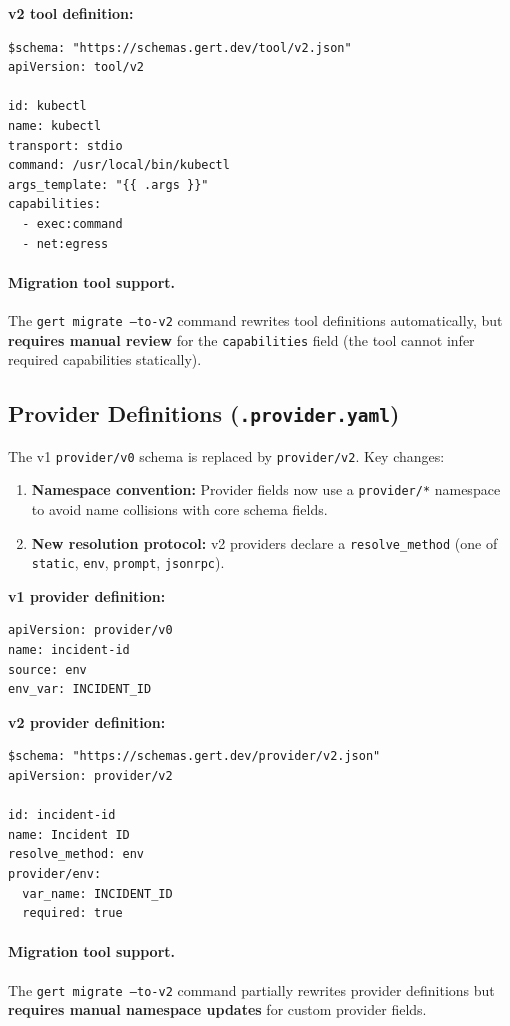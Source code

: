 \textbf{v2 tool definition:}
\begin{verbatim}
$schema: "https://schemas.gert.dev/tool/v2.json"
apiVersion: tool/v2

id: kubectl
name: kubectl
transport: stdio
command: /usr/local/bin/kubectl
args_template: "{{ .args }}"
capabilities:
  - exec:command
  - net:egress
\end{verbatim}

\paragraph{Migration tool support.} The \texttt{gert migrate --to-v2} command rewrites tool definitions automatically, but \textbf{requires manual review} for the \texttt{capabilities} field (the tool cannot infer required capabilities statically).

\subsection{Provider Definitions (\texttt{.provider.yaml})}

The v1 \texttt{provider/v0} schema is replaced by \texttt{provider/v2}. Key changes:

\begin{enumerate}
  \item \textbf{Namespace convention:} Provider fields now use a \texttt{provider/*} namespace to avoid name collisions with core schema fields.
  \item \textbf{New resolution protocol:} v2 providers declare a \texttt{resolve\_method} (one of \texttt{static}, \texttt{env}, \texttt{prompt}, \texttt{jsonrpc}).
\end{enumerate}

\textbf{v1 provider definition:}
\begin{verbatim}
apiVersion: provider/v0
name: incident-id
source: env
env_var: INCIDENT_ID
\end{verbatim}

\textbf{v2 provider definition:}
\begin{verbatim}
$schema: "https://schemas.gert.dev/provider/v2.json"
apiVersion: provider/v2

id: incident-id
name: Incident ID
resolve_method: env
provider/env:
  var_name: INCIDENT_ID
  required: true
\end{verbatim}

\paragraph{Migration tool support.} The \texttt{gert migrate --to-v2} command partially rewrites provider definitions but \textbf{requires manual namespace updates} for custom provider fields.


